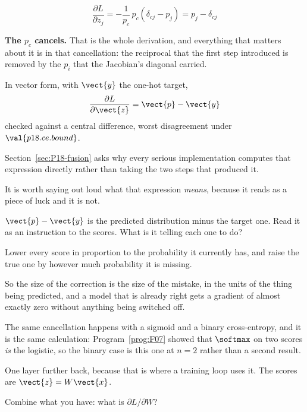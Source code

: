 \begin{fr}
\begin{ansblock}
\[ \frac{\partial L}{\partial z_j}
   = -\frac{1}{p_c}\,p_c(\delta_{cj} - p_j) = p_j - \delta_{cj} \]
\end{ansblock}

\textbf{The $p_c$ cancels.} That is the whole derivation, and everything that
matters about it is in that cancellation: the reciprocal that the first step
introduced is removed by the $p_i$ that the Jacobian's diagonal carried.

In vector form, with $\vect{y}$ the one-hot target,
\[ \frac{\partial L}{\partial \vect{z}} = \vect{p} - \vect{y} \]
checked against a central difference, worst disagreement under
$\val{p18.ce.bound}$.

Section~\ref{sec:P18-fusion} asks why every serious implementation computes
that expression directly rather than taking the two steps that produced it.
\end{fr}

\begin{fr}
It is worth saying out loud what that expression \emph{means}, because it
reads as a piece of luck and it is not.

$\vect{p} - \vect{y}$ is the predicted distribution minus the target one.
Read it as an instruction to the scores. What is it telling each one to do?
\dotline
\nextframe
\end{fr}

\begin{fr}
\begin{ansblock}
Lower every score in proportion to the probability it currently has, and
raise the true one by however much probability it is missing.
\end{ansblock}

So the size of the correction is the size of the mistake, in the units of the
thing being predicted, and a model that is already right gets a gradient of
almost exactly zero without anything being switched off.

\begin{note}
The same cancellation happens with a sigmoid and a binary cross-entropy, and
it is the same calculation: Program~\ref{prog:F07} showed that
$\softmax$ on two scores \emph{is} the logistic, so the binary case is this
one at $n = 2$ rather than a second result.
\end{note}
\end{fr}

\begin{fr}
One layer further back, because that is where a training loop uses it. The
scores are $\vect{z} = W\vect{x}$.

Combine what you have: what is $\partial L/\partial W$?
\nextframe
\end{fr}

